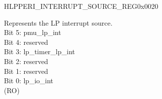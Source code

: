 \begin{register}{H}{LPPERI\_INTERRUPT\_SOURCE\_REG}{0x0020}\label{regdesc:LPPERIINTERRUPTSOURCEREG}
%
%
\regnewline%
\begin{regdesc}\begin{reglist}
\label{fielddesc:LPPERILPINTERRUPTSOURCE}\item [LPPERI\_LP\_INTERRUPT\_SOURCE] Represents the LP interrupt source.\\
Bit 5: pmu\_lp\_int\\
Bit 4: reserved\\
Bit 3: lp\_timer\_lp\_int\\
Bit 2: reserved\\
Bit 1: reserved\\
Bit 0: lp\_io\_int\\
(RO)
\end{reglist}\end{regdesc}
\end{register}


